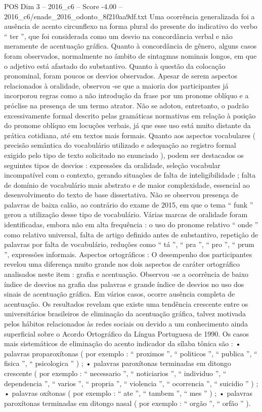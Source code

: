 \begin{textsample}{POS Dim 3 – 2016\_c6 – Score -4.00 – 2016\_c6/enade\_2016\_odonto\_8f210aa9df.txt}
Uma ocorrência generalizada foi a ausência de acento circunflexo na forma plural do presente do indicativo do verbo “ ter ”, que foi considerada como um desvio na concordância verbal e não meramente de acentuação gráfica.
Quanto à concordância de gênero, alguns casos foram observados, normalmente no âmbito de sintagmas nominais longos, em que o adjetivo está afastado do substantivo.
Quanto à questão da colocação pronominal, foram poucos os desvios observados.
Apesar de serem aspectos relacionados à oralidade, observou -se que a maioria dos participantes já incorporou regras como a não introdução da frase por um pronome oblíquo e a próclise na presença de um termo atrator.
Não se adotou, entretanto, o padrão excessivamente formal descrito pelas gramáticas normativas em relação à posição do pronome oblíquo em locuções verbais, já que esse uso está muito distante da prática cotidiana, até em textos mais formais.
Quanto aos aspectos vocabulares ( precisão semântica do vocabulário utilizado e adequação ao registro formal exigido pelo tipo de texto solicitado no enunciado ), podem ser destacados os seguintes tipos de desvios : expressões da oralidade, seleção vocabular incompatível com o contexto, gerando situações de falta de inteligibilidade ; falta de domínio de vocabulário mais abstrato e de maior complexidade, essencial ao desenvolvimento do texto de base dissertativa.
Não se observou presença de palavras de baixa calão, ao contrário do exame de 2015, em que o tema “ funk ” gerou a utilização desse tipo de vocabulário.
Várias marcas de oralidade foram identificadas, embora não em alta frequência : o uso do pronome relativo “ onde ” como relativo universal, falta de artigo definido antes de substantivo, repetição de palavras por falta de vocabulário, reduções como “ tá ”, “ pra ”, “ pro ”, “ prum ”, expressões informais.
Aspectos ortográficos : O desempenho dos participantes revelou uma diferença muito grande nos dois aspectos de caráter ortográfico analisados neste item : grafia e acentuação.
Observou -se a ocorrência de baixo índice de desvios na grafia das palavras e grande índice de desvios no uso dos sinais de acentuação gráfica.
Em vários casos, ocorre ausência completa de acentuação.
Os resultados revelam que existe uma tendência crescente entre os universitários brasileiros de eliminação da acentuação gráfica, talvez motivada pelos hábitos relacionados às redes sociais ou devido a um conhecimento ainda superficial sobre o Acordo Ortográfico da Língua Portuguesa de 1990.
Os casos mais sistemáticos de eliminação do acento indicador da sílaba tônica são : • palavras proparoxítonas ( por exemplo : “ proximos ”, “ politicos ”, “ publica ”, “ fisica ”, “ psicologica ” ) ; • palavras paroxítonas terminadas em ditongo crescente ( por exemplo : “ necessario ”, “ noticiarios ”, “ individuo ”, “ dependencia ”, “ varios ”, “ propria ”, “ violencia ”, “ ocorrencia ”, “ suicidio ” ) ; • palavras oxítonas ( por exemplo : “ ate ”, “ tambem ”, “ mes ” ) ; • palavras paroxítonas terminadas em ditongo nasal ( por exemplo : “ orgão ”, “ orfão ” ).

\end{textsample}

